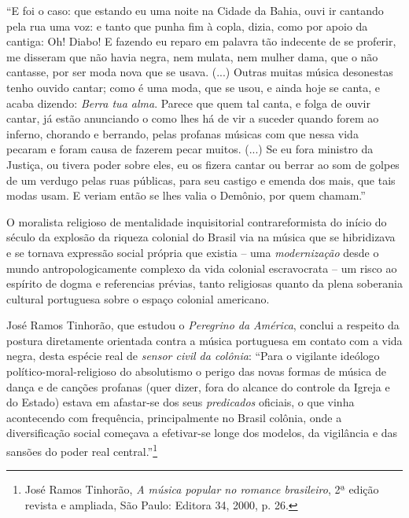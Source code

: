 ``E foi o caso: que estando eu uma noite na Cidade da Bahia, ouvi ir
cantando pela rua uma voz: e tanto que punha fim à copla, dizia, como
por apoio da cantiga: Oh! Diabo! E fazendo eu reparo em palavra tão
indecente de se proferir, me disseram que não havia negra, nem mulata,
nem mulher dama, que o não cantasse, por ser moda nova que se usava.
(...) Outras muitas música desonestas tenho ouvido cantar; como é uma
moda, que se usou, e ainda hoje se canta, e acaba dizendo: \emph{Berra
tua alma}. Parece que quem tal canta, e folga de ouvir cantar, já estão
anunciando o como lhes há de vir a suceder quando forem ao inferno,
chorando e berrando, pelas profanas músicas com que nessa vida pecaram e
foram causa de fazerem pecar muitos. (...) Se eu fora ministro da
Justiça, ou tivera poder sobre eles, eu os fizera cantar ou berrar ao
som de golpes de um verdugo pelas ruas públicas, para seu castigo e
emenda dos mais, que tais modas usam. E veriam então se lhes valia o
Demônio, por quem chamam.''

O moralista religioso de mentalidade inquisitorial contrareformista do
início do século da explosão da riqueza colonial do Brasil via na música
que se hibridizava e se tornava expressão social própria que existia --
uma \emph{modernização} desde o mundo antropologicamente complexo da
vida colonial escravocrata -- um risco ao espírito de dogma e
referencias prévias, tanto religiosas quanto da plena soberania cultural
portuguesa sobre o espaço colonial americano.

José Ramos Tinhorão, que estudou o \emph{Peregrino da América}, conclui
a respeito da postura diretamente orientada contra a música portuguesa
em contato com a vida negra, desta espécie real de \emph{sensor civil da
colônia}: ``Para o vigilante ideólogo político-moral-religioso do
absolutismo o perigo das novas formas de música de dança e de canções
profanas (quer dizer, fora do alcance do controle da Igreja e do Estado)
estava em afastar-se dos seus \emph{predicados} oficiais, o que vinha
acontecendo com frequência, principalmente no Brasil colônia, onde a
diversificação social começava a efetivar-se longe dos modelos, da
vigilância e das sansões do poder real central.''\footnote{José Ramos
  Tinhorão, \emph{A música popular no romance brasileiro}, 2ª edição
  revista e ampliada, São Paulo: Editora 34, 2000, p. 26.}

